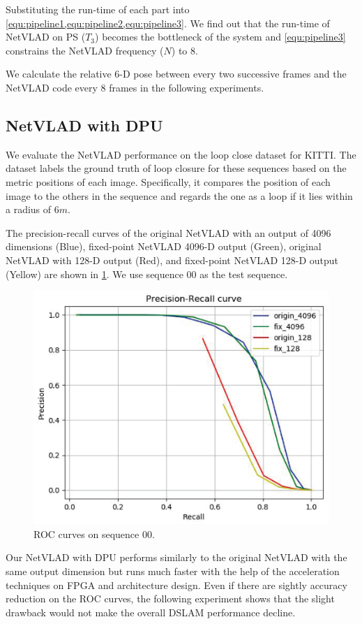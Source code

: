 Substituting the run-time of each part into \cref{equ:pipeline1,equ:pipeline2,equ:pipeline3}. We find out that the run-time of NetVLAD on PS ($T_{3}$) becomes the bottleneck of the system and \cref{equ:pipeline3} constrains the NetVLAD frequency ($N$) to $8$.

We calculate the relative 6-D pose between every two successive frames and the NetVLAD code every $8$ frames in the following experiments.

\subsection{NetVLAD with DPU}

We evaluate the NetVLAD performance on the loop close dataset for KITTI\cite{KITTIGroundTruth}.
The dataset labels the ground truth of loop closure for these sequences based on the metric positions of each image. Specifically, it compares the position of each image to the others in the sequence and regards the one as a loop if it lies within a radius of $6m$.

The precision-recall curves of the original NetVLAD with an output of 4096 dimensions (Blue), fixed-point NetVLAD 4096-D output (Green), original NetVLAD with 128-D output (Red), and fixed-point NetVLAD 128-D output (Yellow) are shown in \cref{fig:reloc}. We use sequence 00 as the test sequence.


\begin{figure}[t]
  \centering  
  \includegraphics[width=0.75\linewidth]{fig/val_reloc.eps}
  \caption{ROC curves on sequence 00.}
  \label{fig:reloc}
\end{figure}

Our NetVLAD with DPU performs similarly to the original NetVLAD with the same output dimension but runs much faster with the help of the acceleration techniques on FPGA and architecture design. Even if there are sightly accuracy reduction on the ROC curves, the following experiment shows that the slight drawback would not make the overall DSLAM performance decline.

